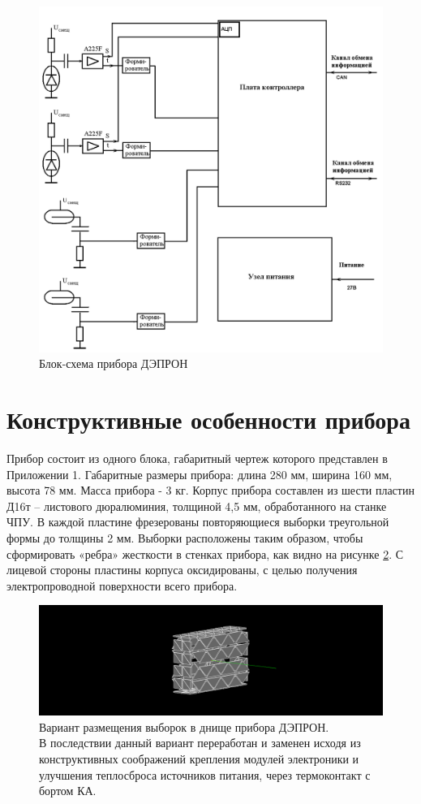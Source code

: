 \begin{figure}
\centering
\includegraphics[width=0.8\linewidth]{images/Depron_blocksch}
\caption{Блок-схема прибора ДЭПРОН}
\label{fig:Depron_blocksch}
\end{figure}


\section{Конструктивные особенности прибора}

Прибор состоит из одного блока, габаритный чертеж которого представлен в Приложении 1. Габаритные размеры прибора: длина  280 мм, ширина 160 мм, высота 78 мм. Масса прибора - 3 кг. Корпус прибора составлен из шести пластин Д16т -- листового дюралюминия, толщиной 4,5 мм, обработанного на станке ЧПУ. В каждой пластине фрезерованы повторяющиеся выборки треугольной формы до толщины 2 мм. Выборки расположены таким образом, чтобы сформировать «ребра» жесткости в стенках прибора, как видно на рисунке \ref{fig:viborki}. С лицевой стороны пластины корпуса оксидированы, с целью получения электропроводной поверхности всего прибора.

\begin{figure}
\centering
\includegraphics[width=0.7\linewidth]{images/viborki}
\caption{ Вариант размещения выборок в днище прибора ДЭПРОН.\\ В последствии данный вариант переработан и заменен исходя из конструктивных соображений крепления модулей электроники и улучшения теплосброса источников питания, через термоконтакт с бортом КА. }
\label{fig:viborki}
\end{figure}


